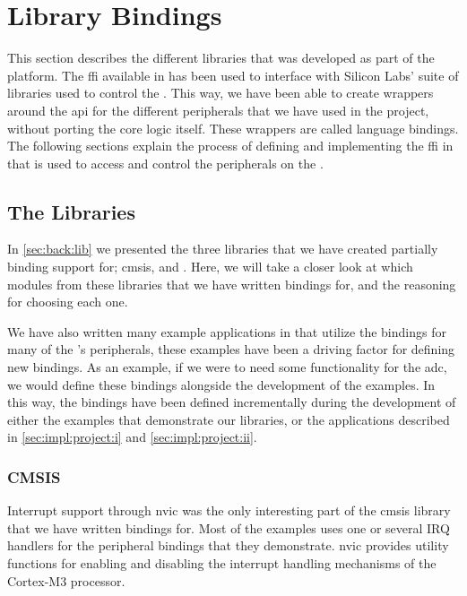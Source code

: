 
\section{Library Bindings}
\label{sub:interfacing_with_emlib}

This section describes the different  libraries that was developed as part of the {\rg} platform.
The \gls{ffi} available in {\rust} has been used to interface with Silicon Labs' suite of {\C} libraries used to control the {\gecko}.
This way, we have been able to create wrappers around the \gls{api} for the different peripherals that we have used in the project, without porting the core logic itself.
These wrappers are called language bindings.
The following sections explain the process of defining and implementing the \gls{ffi} in {\rust} that is used to access and control the peripherals on the {\gecko}.

\subsection{The Libraries}
\label{ssub:the_bindings_library}

In \autoref{sec:back:lib} we presented the three libraries that we have created partially binding support for; \gls{cmsis}, {\emlib} and {\emdrv}.
Here, we will take a closer look at which modules from these libraries that we have written bindings for, and the reasoning for choosing each one.

We have also written many example applications in {\rust} that utilize the bindings for many of the {\gecko}'s peripherals, these examples have been a driving factor for defining new bindings.
As an example, if we were to need some functionality for the \gls{adc}, we would define these bindings alongside the development of the examples.
In this way, the bindings have been defined incrementally during the development of either the examples that demonstrate our libraries, or the applications described in \autoref{sec:impl:project:i} and \autoref{sec:impl:project:ii}.

\subsubsection{CMSIS}
\label{sub:cmsis_bindings}

Interrupt support through \gls{nvic} was the only interesting part of the \gls{cmsis} library that we have written bindings for.
Most of the examples uses one or several IRQ handlers for the peripheral bindings that they demonstrate.
\gls{nvic} provides utility functions for enabling and disabling the interrupt handling mechanisms of the Cortex-M3 processor.

